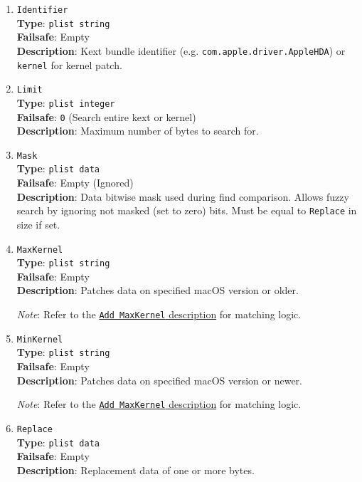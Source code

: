 \documentclass[]{article}
\begin{document}
\begin{enumerate}
\item
  \texttt{Identifier}\\
  \textbf{Type}: \texttt{plist\ string}\\
  \textbf{Failsafe}: Empty\\
  \textbf{Description}: Kext bundle identifier (e.g. \texttt{com.apple.driver.AppleHDA})
  or \texttt{kernel} for kernel patch.

\item
  \texttt{Limit}\\
  \textbf{Type}: \texttt{plist\ integer}\\
  \textbf{Failsafe}: \texttt{0} (Search entire kext or kernel)\\
  \textbf{Description}: Maximum number of bytes to search for.

\item
  \texttt{Mask}\\
  \textbf{Type}: \texttt{plist\ data}\\
  \textbf{Failsafe}: Empty (Ignored)\\
  \textbf{Description}: Data bitwise mask used during find comparison.
  Allows fuzzy search by ignoring not masked (set to zero) bits.
  Must be equal to \texttt{Replace} in size if set.

\item
  \texttt{MaxKernel}\\
  \textbf{Type}: \texttt{plist\ string}\\
  \textbf{Failsafe}: Empty\\
  \textbf{Description}: Patches data on specified macOS version or older.

  \emph{Note}: Refer to the \hyperlink{kernmatch}{\texttt{Add\ MaxKernel} description} for matching logic.

\item
  \texttt{MinKernel}\\
  \textbf{Type}: \texttt{plist\ string}\\
  \textbf{Failsafe}: Empty\\
  \textbf{Description}: Patches data on specified macOS version or newer.

  \emph{Note}: Refer to the \hyperlink{kernmatch}{\texttt{Add\ MaxKernel} description} for matching logic.

\item
  \texttt{Replace}\\
  \textbf{Type}: \texttt{plist\ data}\\
  \textbf{Failsafe}: Empty\\
  \textbf{Description}: Replacement data of one or more bytes.


\end{enumerate}
\end{document}
